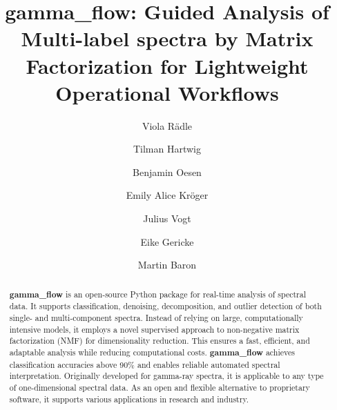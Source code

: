 \documentclass[preprint,12pt, a4paper]{elsarticle}
\begin{document}
\renewcommand{\labelenumii}{\arabic{enumi}.\arabic{enumii}}

\begin{frontmatter}



\title{gamma\_flow: \textbf{G}uided \textbf{A}nalysis of \textbf{M}ulti-label spectra by \textbf{Ma}trix \textbf{F}actorization for \textbf{L}ightweight \textbf{O}perational \textbf{W}orkflows}


\author[ki-lab]{Viola Rädle }
\author[ki-lab]{Tilman Hartwig}
\author[ki-lab]{Benjamin Oesen}
\author[bfs]{Emily Alice Kröger}
\author[bfs]{Julius Vogt}
\author[bfs]{Eike Gericke}
\author[bfs]{Martin Baron}

\address[ki-lab]{Application Lab for AI and Big Data, German Environmental Agency, Leipzig, Germany}
\address[bfs]{Federal Office for Radiation Protection, Berlin, Germany}



\begin{abstract}
\textbf{gamma\_flow} is an open-source Python package for real-time analysis of spectral data. It supports classification, denoising, decomposition, and outlier detection of both single- and multi-component spectra. Instead of relying on large, computationally intensive models, it employs a novel supervised approach to non-negative matrix factorization (NMF) for dimensionality reduction. This ensures a fast, efficient, and adaptable analysis while reducing computational costs. \textbf{gamma\_flow} achieves classification accuracies above 90\% and enables reliable automated spectral interpretation. Originally developed for gamma-ray spectra, it is applicable to any type of one-dimensional spectral data. As an open and flexible alternative to proprietary software, it supports various applications in research and industry.
\end{abstract}


\end{frontmatter}
\end{document}
